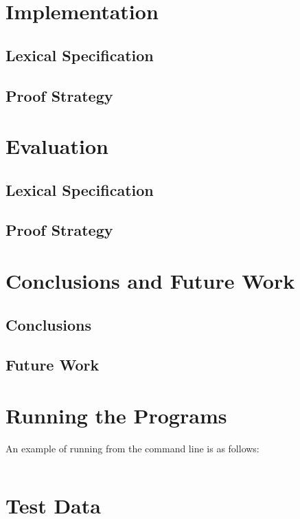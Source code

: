 \documentclass{l4proj}
\begin{document}
\chapter{Implementation}

\section{Lexical Specification}

\section{Proof Strategy}

\chapter{Evaluation}

\section{Lexical Specification}

\section{Proof Strategy}

\chapter{Conclusions and Future Work}

\section{Conclusions}

\section{Future Work}

\begin{appendices}

\chapter{Running the Programs}
An example of running from the command line is as follows:
\begin{verbatim}
\end{verbatim}

\chapter{Test Data}

\end{appendices}




\end{document}
